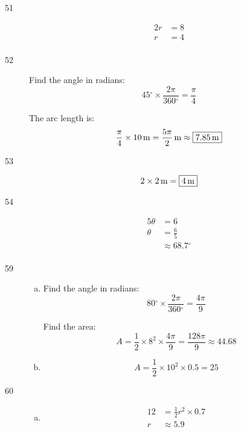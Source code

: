 \documentclass{exam}
\newcommand{\degree}{\ensuremath{^\circ}}
\begin{document}
\begin{description}
      \item[51]
        \begin{align*}
          2 r & = 8 \\
          r   & = \boxed{ 4 } \\
        \end{align*}

      \item[52]
        Find the angle in radians:
        \[
          45 \degree \times \frac{2 \pi}{360 \degree} = \frac{\pi}{4}
        \]

        The arc length is:
        \[
          \frac{\pi}{4} \times \unit[10]{m} = \unit[ \frac{5 \pi}{2} ]{m} \approx \boxed{ \unit[7.85]{m} }
        \]

      \item[53]
        \[
          2 \times \unit[2]{m} = \boxed{ \unit[4]{m} } 
        \]

      \item[54]
        \begin{align*}
          5 \theta & = 6 \\
          \theta   & = \boxed{ \frac{6}{5} } \\
                   & \approx \boxed{ 68.7 \degree } \\
        \end{align*}

      \item[59]
        \begin{enumerate}[(a)]
          \item 
            Find the angle in radians:
            \[
              80 \degree \times \frac{2 \pi}{360 \degree} = \frac{4 \pi}{9}
            \]

            Find the area:
            \[
              A = \frac{1}{2} \times 8^2 \times \frac{4 \pi}{9} = \frac{128 \pi}{9} \approx \boxed{ 44.68 }
            \]

          \item
            \[
              A = \frac{1}{2} \times 10^2 \times 0.5 = \boxed{ 25 }
            \]
        \end{enumerate}

      \item[60]
        \begin{enumerate}[(a)]
          \item
            \begin{align*}
              12 & = \frac{1}{2} r^2 \times 0.7 \\
              r  & \approx \boxed{ 5.9 } \\
            \end{align*}


\end{enumerate}
\end{description}
\end{document}

